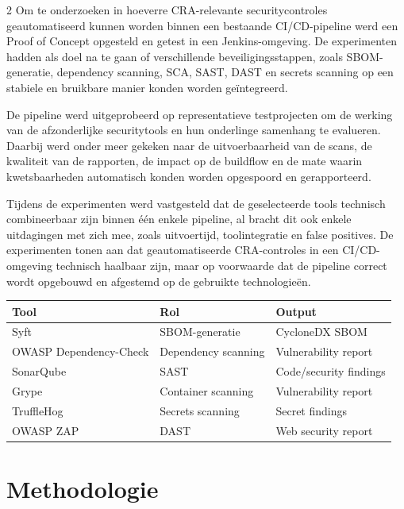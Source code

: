 \documentclass[a0,portrait]{hogent-poster}
\begin{document}
\begin{multicols}{2}
Om te onderzoeken in hoeverre CRA-relevante securitycontroles geautomatiseerd kunnen worden binnen een bestaande CI/CD-pipeline werd een Proof of Concept opgesteld en getest in een Jenkins-omgeving. De experimenten hadden als doel na te gaan of verschillende beveiligingsstappen, zoals SBOM-generatie, dependency scanning, SCA, SAST, DAST en secrets scanning op een stabiele en bruikbare manier konden worden geïntegreerd.

De pipeline werd uitgeprobeerd op representatieve testprojecten om de werking van de afzonderlijke securitytools en hun onderlinge samenhang te evalueren. Daarbij werd onder meer gekeken naar de uitvoerbaarheid van de scans, de kwaliteit van de rapporten, de impact op de buildflow en de mate waarin kwetsbaarheden automatisch konden worden opgespoord en gerapporteerd.

Tijdens de experimenten werd vastgesteld dat de geselecteerde tools technisch combineerbaar zijn binnen één enkele pipeline, al bracht dit ook enkele uitdagingen met zich mee, zoals uitvoertijd, toolintegratie en false positives. De experimenten tonen aan dat geautomatiseerde CRA-controles in een CI/CD-omgeving technisch haalbaar zijn, maar op voorwaarde dat de pipeline correct wordt opgebouwd en afgestemd op de gebruikte technologieën.


\begin{center}
  \label{tab:used-tools}
  \small
  \begin{tabular}{|l|l|l|}
  \hline
  \textbf{Tool} & \textbf{Rol} & \textbf{Output} \\
  \hline
  Syft & SBOM-generatie & CycloneDX SBOM \\
  \hline
  OWASP Dependency-Check & Dependency scanning & Vulnerability report \\
  \hline
  SonarQube & SAST & Code/security findings \\
  \hline
  Grype & Container scanning & Vulnerability report \\
  \hline
  TruffleHog & Secrets scanning & Secret findings \\
  \hline
  OWASP ZAP & DAST & Web security report \\
  \hline
  \end{tabular}
\end{center}


\section{Methodologie}


\end{multicols}
\end{document}
